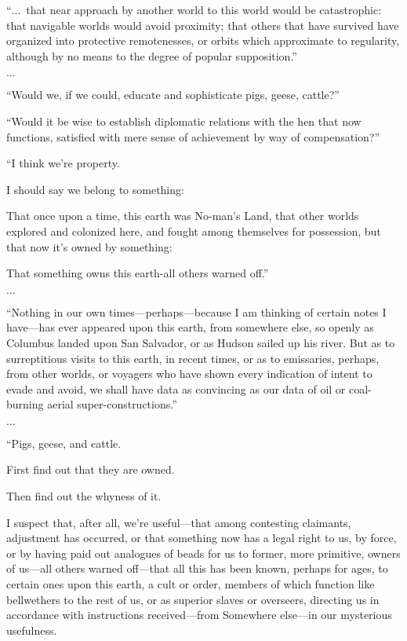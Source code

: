 \begin{svgraybox}
``$\ldots$~that near approach by another world to this world would be catastrophic:
that navigable worlds would avoid proximity;
that others that have survived have organized into protective remotenesses,
or orbits which approximate to regularity, although by no means to the degree of popular supposition.''

$\ldots$

``Would we, if we could, educate and sophisticate pigs, geese, cattle?''

``Would it be wise to establish diplomatic relations with the hen that now functions,
satisfied with mere sense of achievement by way of compensation?''


``I think we're property.

I should say we belong to something:

That once upon a time, this earth was No-man's Land, that other worlds explored and colonized here,
and fought among themselves for possession, but that now it's owned by something:

That something owns this earth-all others warned off.''

$\ldots$

``Nothing in our own times---perhaps---because I am thinking of certain notes I have---has ever appeared upon this earth, from somewhere else,
so openly as Columbus landed upon San Salvador, or as Hudson sailed up his river.
 But as to surreptitious visits to this earth, in recent times, or as to emissaries, perhaps, from other worlds,
or voyagers who have shown every indication of intent to evade and avoid,
we shall have data as convincing as our data of oil or coal-burning aerial super-constructions.''


$\ldots$

``Pigs, geese, and cattle.

First find out that they are owned.

Then find out the whyness of it.

I suspect that, after all, we're useful---that among contesting claimants, adjustment has occurred,
 or that something now has a legal right to us, by force,
or by having paid out analogues of beads for us to former, more primitive,
owners of us---all others warned off---that all this has been known, perhaps for ages, to certain ones upon this earth,
a cult or order, members of which function like bellwethers
 to the rest of us, or as superior slaves or overseers,
directing us in accordance with instructions received---from Somewhere else---in our mysterious usefulness.


\end{svgraybox}
